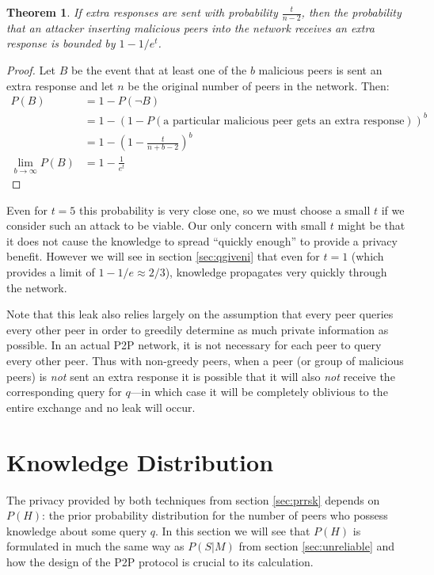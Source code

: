 \documentclass{article}
\newcommand{\secref}[1]{section \ref{sec:#1}}
\newtheorem{theorem}{Theorem}
\begin{document}
\begin{theorem}
	If extra responses are sent with probability $\frac{t}{n-2}$, then the
	probability that an attacker inserting malicious peers into the network
	receives an extra response is bounded by $1-1/e^t$.
\end{theorem}
\begin{proof}
Let $B$ be the event that at least one of the $b$ malicious peers is sent an extra
	response and let $n$ be the original number of peers in the network. Then:
\begin{align*}
	P(B)&=1-P(\neg B)\\
	&=1-\left(1-P(\text{a particular malicious peer gets an extra response})\right)^b\\
	&=1-\left(1-\frac{t}{n+b-2}\right)^b\\
	\lim_{b\rightarrow\infty}P(B)&=1-\frac{1}{e^t}
\end{align*}
\end{proof}
Even for $t=5$ this probability is very close one, so we must choose a small $t$
if we consider such an attack to be viable.  Our only concern with small $t$
might be that it does not cause the knowledge to spread ``quickly enough'' to
provide a privacy benefit. However we will see in \secref{qgiveni} that even for
$t=1$ (which provides a limit of $1-1/e\approx2/3$), knowledge propagates very
quickly through the network.

Note that this leak also relies largely on the assumption that every peer
queries every other peer in order to greedily determine as much private
information as possible. In an actual P2P network, it is not necessary for each
peer to query every other peer. Thus with non-greedy peers, when a peer (or
group of malicious peers) is
{\it not} sent an extra response it is possible that it will also {\it not} receive the
corresponding query for $q$---in which case it will be completely oblivious to the
entire exchange and no leak will occur.

\section{Knowledge Distribution}\label{sec:kdist}

The privacy provided by both techniques from \secref{prrsk} depends on $P(H)$:
the prior probability distribution for the number of peers who possess knowledge
about some query $q$. In this section we will see that $P(H)$ is formulated in
much the same way as $P(S|M)$ from \secref{unreliable} and how the design of the
P2P protocol is crucial to its calculation.
\end{document}
